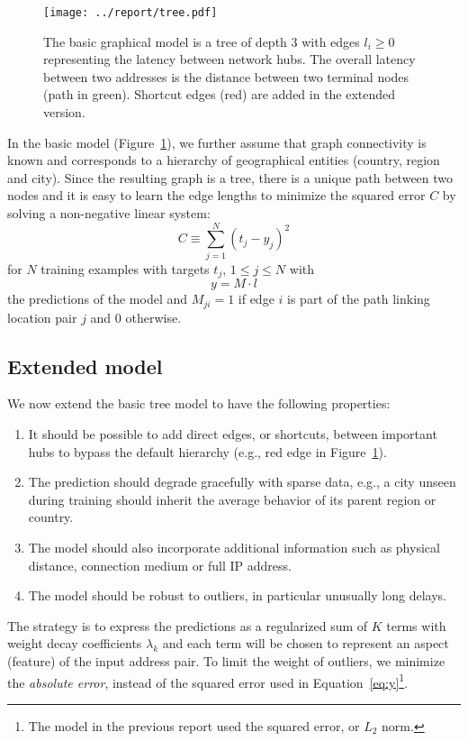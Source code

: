 \documentclass[10pt,a4paper,notitlepage,twocolumn]{article}
\begin{document}
\begin{figure}[h]
\centering
\texttt{[image: ../report/tree.pdf]}
\caption{The basic graphical model is a tree of depth 3 with edges $l_i\ge0$ representing the latency between network hubs.
The overall latency between two addresses is the distance between two terminal nodes (path in green).
Shortcut edges (red) are added in the extended version.
}
\label{fig:tree}
\end{figure}


In the basic model (Figure~\ref{fig:tree}), we further assume that graph connectivity is known and corresponds to a hierarchy of geographical entities (country, region and city).
Since the resulting graph is a tree, there is a unique path between two nodes and it is easy to learn the edge lengths to minimize the squared error $C$ by solving a non-negative linear system:
\begin{equation} \label{eq:cost}
C \equiv \sum_{j=1}^N(t_j-y_j)^2
\end{equation}
for $N$ training examples with targets $t_j$, $1\le j\le N$ with
\begin{equation} \label{eq:y}
y = M\cdot l
\end{equation}
the predictions of the model and $M_{ji}=1$ if edge $i$ is part of the path linking location pair $j$ and 0 otherwise.

\subsection{Extended model}

We now extend the basic tree model to have the following properties:
\begin{enumerate}
\item It should be possible to add direct edges, or shortcuts, between important hubs to bypass the default hierarchy (e.g., red edge in Figure~\ref{fig:tree}).
\item The prediction should degrade gracefully with sparse data, e.g., a city unseen during training should inherit the average behavior of its parent region or country.
\item The model should also incorporate additional information such as physical distance, connection medium or full IP address.
\item The model should be robust to outliers, in particular unusually long delays.
\end{enumerate}

The strategy is to express the predictions as a regularized sum of $K$
terms with weight decay coefficients $\lambda_k$ and each term will be
chosen to represent an aspect (feature) of the input address pair.
To limit the weight of outliers, we minimize the {\em absolute error},
instead of the squared error used in Equation~\ref{eq:y}\footnote{The
model in the previous report used the squared error, or $L_2$ norm.}.
\end{document}

